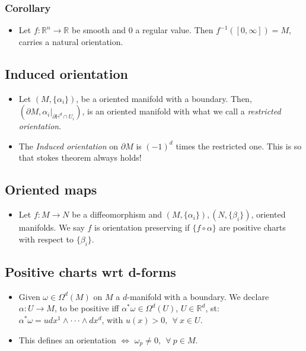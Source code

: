 \documentclass[11pt]{article}
\DeclareRobustCommand{\RR}{\mathbb{R}}
\numberwithin{equation}{section}
\begin{document}
\subsubsection{Corollary}
\begin{itemize}
    \item Let $f:\RR^n \rightarrow \RR$ be smooth and $0$ a regular value. Then $f^{-1}([ 0,\infty])=M$, carries a natural orientation. 
\end{itemize}

\subsection{Induced orientation}
\begin{itemize}
    \item Let $(M,\{\alpha_i\})$, be a oriented manifold with a boundary. Then, $(\partial M, {\alpha_i\bigg\vert_{\partial \mathbb{H}^d\cap U_i}})$, is an oriented manifold with what we call a \emph{restricted orientation}. 

\item The \emph{Induced orientation} on $\partial M$ is $(-1)^d$ times the restricted one. This is so that stokes theorem always holds! 
\end{itemize}

\subsection{Oriented maps }
\begin{itemize}
    \item Let $f:M\rightarrow N$ be a diffeomorphism and $(M,\{\alpha_i\}),(N,\{\beta_i\})$, oriented manifolds. We say $f$ is orientation preserving if $\{f \circ \alpha\}$ are positive charts with respect to $\{\beta_i\}$. 
\end{itemize}

\subsection{Positive charts wrt d-forms}
\begin{itemize}
    \item Given $\omega \in \Omega^d(M)$ on $M$ a $d$-manifold with a boundary. We declare $\alpha:U \rightarrow M$, to be positive iff $\alpha^{\ast}\omega \in \Omega^d(U)$, $U \in \RR^d$, st: $\alpha^{\ast}\omega = udx^1\wedge\cdot\cdot\cdot \wedge dx^d$, with $u(x)>0,~~\forall~x\in U$. 

\item This defines an orientation $\iff$ $\omega_p\neq 0,~~\forall~p\in M$.  
\end{itemize}
\end{document}
